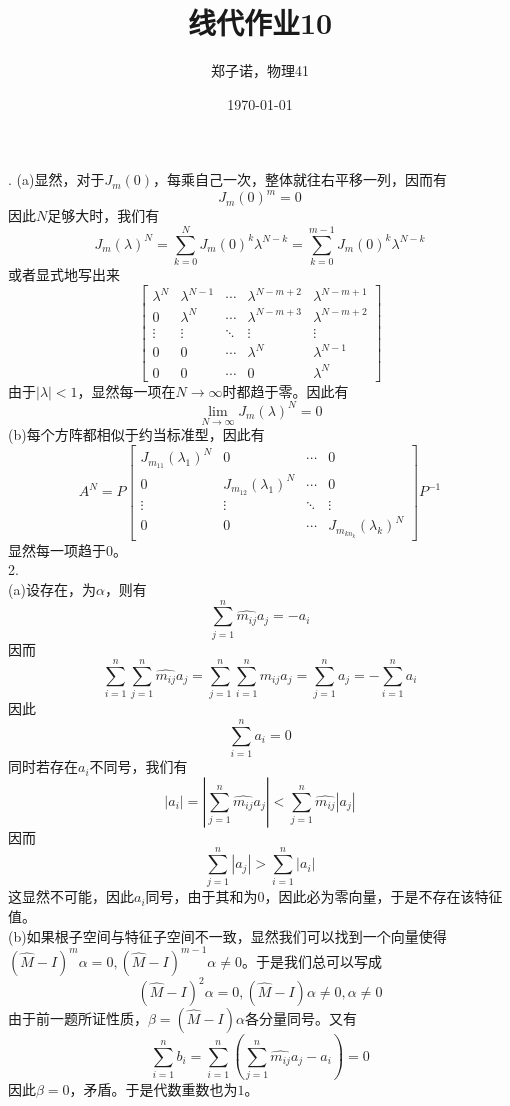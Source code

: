 \documentclass[utf8]{ctexart}
\title{线代作业10}
\author{郑子诺，物理41}
\date{\today}
\begin{document}
\maketitle
{}.
(a)显然，对于$J_m(0)$，每乘自己一次，整体就往右平移一列，因而有
\[J_m(0)^m=0\]
因此$N$足够大时，我们有
\[J_m(\lambda)^N=\sum_{k=0}^NJ_m(0)^k\lambda^{N-k}=\sum_{k=0}^{m-1}J_m(0)^k\lambda^{N-k}\]
或者显式地写出来
\[\begin{bmatrix}
	\lambda^N&\lambda^{N-1}&\cdots&\lambda^{N-m+2}&\lambda^{N-m+1}\\
	0&\lambda^N&\cdots&\lambda^{N-m+3}&\lambda^{N-m+2}\\
	\vdots&\vdots&\ddots&\vdots&\vdots\\
	0&0&\cdots&\lambda^N&\lambda^{N-1}\\
	0&0&\cdots&0&\lambda^N
\end{bmatrix}\]
由于$|\lambda|<1$，显然每一项在$N\rightarrow\infty$时都趋于零。因此有
\[\lim_{N\rightarrow\infty}J_m(\lambda)^N=0\]
(b)每个方阵都相似于约当标准型，因此有
\[A^N=P\begin{bmatrix}
	J_{m_{11}}(\lambda_1)^N&0&\cdots&0\\
	0&J_{m_{12}}(\lambda_1)^N&\cdots&0\\
	\vdots&\vdots&\ddots&\vdots\\
	0&0&\cdots&J_{m_{kn_k}}(\lambda_k)^N
\end{bmatrix}P^{-1}\]
显然每一项趋于$0$。\\
2.\\
(a)设存在，为$\alpha$，则有
\[\sum_{j=1}^n\hat{m_{ij}}a_j=-a_i\]
因而
\[\sum_{i=1}^n\sum_{j=1}^n\hat{m_{ij}}a_j=\sum_{j=1}^n\sum_{i=1}^n\hat{m_{ij}}a_j=\sum_{j=1}^na_j=-\sum_{i=1}^na_i\]
因此
\[\sum_{i=1}^na_i=0\]
同时若存在$a_i$不同号，我们有
\[|a_i|=|\sum_{j=1}^n\hat{m_{ij}}a_j|<\sum_{j=1}^n\hat{m_{ij}}|a_j|\]
因而
\[\sum_{j=1}^n|a_j|>\sum_{i=1}^n|a_i|\]
这显然不可能，因此$a_i$同号，由于其和为$0$，因此必为零向量，于是不存在该特征值。\\
(b)如果根子空间与特征子空间不一致，显然我们可以找到一个向量使得$(\widehat{M}-I)^m\alpha=0,(\widehat{M}-I)^{m-1}\alpha\neq0$。于是我们总可以写成
\[(\widehat{M}-I)^2\alpha=0,(\widehat{M}-I)\alpha\neq0,\alpha\neq0\]
由于前一题所证性质，$\beta=(\widehat{M}-I)\alpha$各分量同号。又有
\[\sum_{i=1}^nb_i=\sum_{i=1}^n(\sum_{j=1}^n\hat{m_{ij}}a_j-a_i)=0\]
因此$\beta=0$，矛盾。于是代数重数也为$1$。
\end{document}
